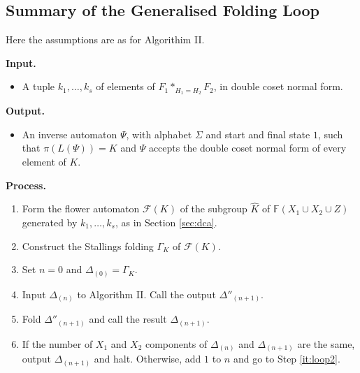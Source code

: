 \documentclass[a4paper,12pt]{article}
\newcommand{\G}{\Gamma }
\newcommand{\D}{\Delta }
\newcommand{\cF}{{\cal{F}}}
\numberwithin{equation}{section}
\numberwithin{figure}{section}
\newcommand{\FF}{\ensuremath{\mathbb{F}}}
\renewcommand{\cF}{\mathcal{F}}
\newcommand{\be}{\begin{enumerate}}
\newcommand{\ee}{\end{enumerate}}
\newcommand{\biz}{\begin{itemize}}
\newcommand{\eiz}{\end{itemize}}
\begin{document}
\subsection{Summary of the Generalised Folding Loop}
Here the assumptions are as for Algorithim II.

\noindent\textbf{Input.}
\biz
\item A tuple $k_1, \ldots ,k_s$ of elements of $F_1*_{H_1=H_2}F_2$,
in double coset normal form.
\eiz
\noindent\textbf{Output.}
\biz
\item An inverse automaton $\Psi$, with alphabet $\Sigma$ and start
and final state $1$, such that $\pi(L(\Psi))=K$ and $\Psi$ accepts the
double coset normal form of every element of $K$.
\eiz
\noindent\textbf{Process.}\\
\be[{D}1]
\item Form the flower automaton $\cF(K)$ of the subgroup $\hat K$ of 
$\FF(X_1\cup X_2\cup Z)$ generated by $k_1,\ldots, k_s$, as in Section 
\ref{sec:dca}. 
\item Construct the Stallings folding $\G_K$ of $\cF(K)$. 
\item Set $n=0$ and $\D_{(0)}=\G_K$.
\item\label{it:loop2} Input $\D_{(n)}$ to Algorithm II.
Call the output $\D''_{(n+1)}$.
\item\label{it:loop3} Fold  $\D''_{(n+1)}$ and call the result   $\D_{(n+1)}$.
\item If the number of $X_1$ and $X_2$ components of $\D_{(n)}$ and
$\D_{(n+1)}$ are the same, output $\D_{(n+1)}$ and halt. Otherwise,
 add $1$ to $n$ and go to Step \ref{it:loop2}.
\ee
\end{document}
